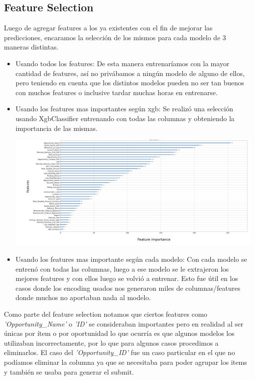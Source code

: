 \documentclass[12pt,a4paper]{article}
\begin{document}
\subsection{Feature Selection}
Luego de agregar features a los ya existentes con el fin de mejorar las predicciones, encaramos la selección de los mismos para cada modelo de 3 maneras distintas. 
 \begin{itemize}
        \item Usando todos los features: De esta manera entrenaríamos con la mayor cantidad de features, así no privábamos a ningún modelo de alguno de ellos, pero teniendo en cuenta que los distintos modelos pueden no ser tan buenos con muchos features o inclusive tardar muchas horas en entrenarse.
        \item Usando los features mas importantes según xgb: Se realizó una selección usando XgbClassifier entrenando con todas las columnas y obteniendo la importancia de las mismas.
        \begin{center}
            \includegraphics[scale=0.5]{imgs/feature-selection-xgb.png}
        \end{center}
        \item Usando los features mas importante según cada modelo: Con cada modelo se entrenó con todas las columnas, luego a ese modelo se le extrajeron los mejores features y con ellos luego se volvió a entrenar.
        Esto fue útil en los casos donde los encoding usados nos generaron miles de columnas/features donde muchos no aportaban nada al modelo.
    \end{itemize}
    
Como parte del feature selection notamos que ciertos features como \textit{'Opportunity\_Name'} o \textit{'ID'} se consideraban importantes pero en realidad al ser únicas por ítem o por oportunidad lo que ocurría es que algunos modelos los utilizaban incorrectamente, por lo que para algunos casos procedimos a eliminarlos.
El caso del \textit{'Opportunity\_ID'} fue un caso particular en el que no podíamos eliminar la columna ya que se necesitaba para poder agrupar los items y también se usaba para generar el submit.
\end{document}
